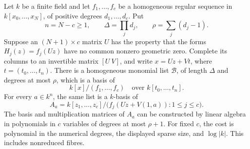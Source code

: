 \begin{lemma}
\label{sci:lem:fibres}
Let \(k\) be a finite field and let \(f_1,\ldots,f_c\) be a homogeneous
regular sequence in \(k[x_0,\ldots,x_N]\), of positive degrees
\(d_1,\ldots,d_c\). Put
\[
 n=N-c\geq1,\qquad \Delta=\prod_jd_j,\qquad
 \rho=\sum_j(d_j-1).
\]
Suppose an \((N+1)\times c\) matrix \(U\) has the property that the
forms \(H_j(z)=f_j(Uz)\) have no common nonzero geometric zero.
Complete its columns to an invertible matrix \([U\ V]\), and write
\(x=Uz+Vt\), where \(t=(t_0,\ldots,t_n)\).
There is a homogeneous monomial list \(\mathcal B\), of length
\(\Delta\) and degrees at most \(\rho\), which is a basis of
\[
 k[x]/(f_1,\ldots,f_c)
 \quad\text{over }k[t_0,\ldots,t_n].
\]
For every \(a\in k^n\), the same list is a \(k\)-basis of
\[
 A_a=k[z_1,\ldots,z_c]/
 \bigl(f_j(Uz+V(1,a)):1\leq j\leq c\bigr).
\]
The basis and multiplication matrices of \(A_a\) can be constructed
by linear algebra in polynomials in \(c\) variables of degrees at most
\(\rho+1\). For fixed \(c\), the cost is polynomial in the numerical
degrees, the displayed sparse size, and \(\log|k|\). This includes
nonreduced fibres.
\end{lemma}
